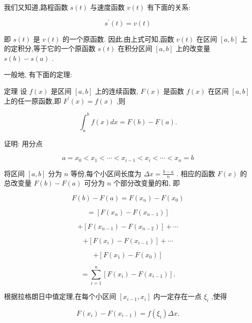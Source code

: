 \documentclass[lang=cn,newtx,10pt,scheme=chinese]{elegantbook}
\begin{document}
我们又知道,路程函数 \(s\left( t\right)\) 与速度函数 \(v\left( t\right)\) 有下面的关系:

\[
{s}^{\prime }\left( t\right) = v\left( t\right)
\]

即 \(s\left( t\right)\) 是 \(v\left( t\right)\) 的一个原函数. 因此,由上式可知,函数 \(v\left( t\right)\) 在区间 \(\left\lbrack {a,b}\right\rbrack\) 上的定积分,等于它的一个原函数 \(s\left( t\right)\) 在积分区间 \(\left\lbrack {a,b}\right\rbrack\) 上的改变量 \(s\left( b\right) - s\left( a\right)\) .

一般地, 有下面的定理:

定理 设 \(f\left( x\right)\) 是区间 \(\left\lbrack {a,b}\right\rbrack\) 上的连续函数, \(F\left( x\right)\) 是函数 \(f\left( x\right)\) 在区间 \(\left\lbrack {a,b}\right\rbrack\) 上的任一原函数,即 \({F}^{\prime }\left( x\right) = f\left( x\right)\) ,则

\[
{\int }_{a}^{b}f\left( x\right) {dx} = F\left( b\right) - F\left( a\right) .
\]

证明: 用分点

\[
a = {x}_{0} < {x}_{1} < \cdots < {x}_{i - 1} < {x}_{i} < \cdots < {x}_{n} = b
\]

将区间 \(\left\lbrack {a,b}\right\rbrack\) 分为 \(n\) 等份,每个小区间长度为 \({\Delta x} = \frac{b - a}{n}\) . 相应的函数 \(F\left( x\right)\) 的总改变量 \(F\left( b\right) - F\left( a\right)\) 可分为 \(n\) 个部分改变量的和, 即

\[
F\left( b\right) - F\left( a\right) = F\left( {x}_{n}\right) - F\left( {x}_{0}\right)
\]

\[
= \left\lbrack {F\left( {x}_{n}\right) - F\left( {x}_{n - 1}\right) }\right\rbrack
\]

\[
+ \left\lbrack {F\left( {x}_{n - 1}\right) - F\left( {x}_{n - 2}\right) }\right\rbrack + \cdots
\]

\[
+ \left\lbrack {F\left( {x}_{i}\right) - F\left( {x}_{i - 1}\right) }\right\rbrack + \cdots
\]

\[
+ \left\lbrack {F\left( {x}_{1}\right) - F\left( {x}_{0}\right) }\right\rbrack
\]

\[
= \mathop{\sum }\limits_{{i = 1}}^{n}\left\lbrack {F\left( {x}_{i}\right) - F\left( {x}_{i - 1}\right) }\right\rbrack \text{.} \tag{1}
\]

根据拉格朗日中值定理,在每个小区间 \(\left\lbrack {{x}_{i - 1},{x}_{i}}\right\rbrack\) 内一定存在一点 \({\xi }_{i}\) ,使得

\[
F\left( {x}_{i}\right) - F\left( {x}_{i - 1}\right) = f\left( {\xi }_{i}\right) {\Delta x}. \tag{2}
\]
\end{document}
